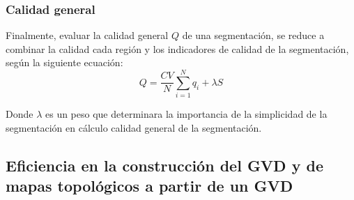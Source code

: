 \subsubsection{Calidad general}
Finalmente, evaluar la calidad general $Q$ de una segmentación, se reduce a combinar la calidad cada región y los indicadores de calidad de la segmentación, según la siguiente ecuación:
\begin{equation}
Q=\frac{CV}{N}\sum^N_{i=1}{q_i+\lambda S}
\end{equation}

Donde $\lambda$ es un peso que determinara la importancia de la simplicidad de la segmentación en cálculo calidad general de la segmentación.


\subsection{Eficiencia en la construcción del GVD y de mapas topológicos a partir de un GVD}



